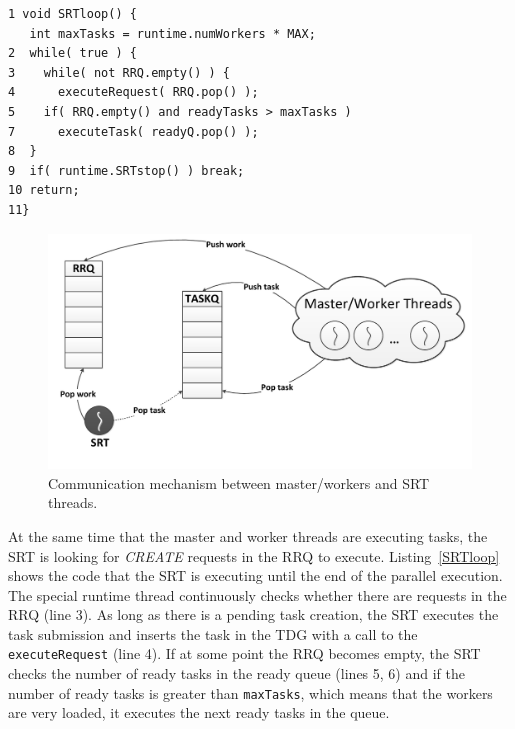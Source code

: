 \begin{lstlisting}[float, emph={void,if,return,non_critical_queue, critical_queue,not,true,and,break}, captionpos=b, caption={Pseudo-code for the SRT loop.},label=SRTloop, emph={[2]mat}, emphstyle={[2]}, aboveskip={0\baselineskip}, frame=tb, belowskip={0\baselineskip}]
1 void SRTloop() {
   int maxTasks = runtime.numWorkers * MAX;
2  while( true ) {   
3    while( not RRQ.empty() ) {
4      executeRequest( RRQ.pop() );
5    if( RRQ.empty() and readyTasks > maxTasks )
7      executeTask( readyQ.pop() );
8  }
9  if( runtime.SRTstop() ) break;
10 return; 
11}  
\end{lstlisting}

\begin{figure}[t]%
	\centering
	\includegraphics[width=1.0\columnwidth]{Figs/communication.pdf}
	\vspace{-0.5cm}
	\caption{Communication mechanism between master/workers and SRT threads.}
	\label{fig:communication}%
	\vspace{-0.3cm}
\end{figure}
At the same time that the master and worker threads are executing tasks, the SRT is looking for \textit{CREATE} requests in the RRQ to execute.
Listing~\ref{SRTloop} shows the code that the SRT is executing until the end of the parallel execution.
The special runtime thread continuously checks whether there are requests in the RRQ (line 3). As long as there is a pending task creation, the SRT executes the task submission and inserts the task in the TDG with a call to the \texttt{executeRequest} (line 4). If at some point the RRQ becomes empty, the SRT checks the number of ready tasks in the ready queue (lines 5, 6) and if the number of ready tasks is greater than \texttt{maxTasks}, which means that the workers are very loaded, it executes the next ready tasks in the queue. 




